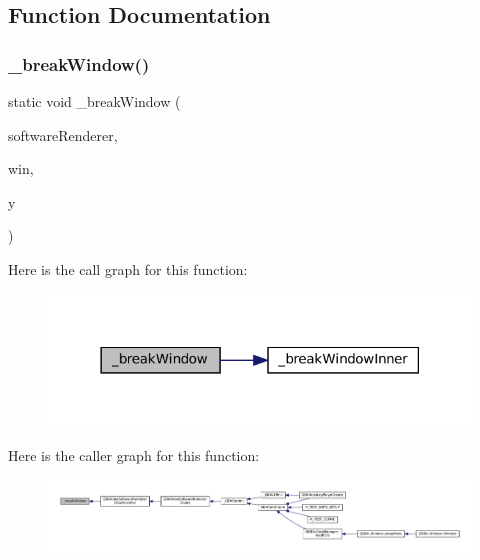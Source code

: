 \subsection{Function Documentation}
\mbox{\label{video-software_8c_ad5aac057b5c5042d19b07e0e0bca757f}} 
\subsubsection{\texorpdfstring{\+\_\+break\+Window()}{\_breakWindow()}}
{\footnotesize\ttfamily static void \+\_\+break\+Window (\begin{DoxyParamCaption}\item[{struct G\+B\+A\+Video\+Software\+Renderer $\ast$}]{software\+Renderer,  }\item[{struct WindowN $\ast$}]{win,  }\item[{\mbox{\hyperlink{ioapi_8h_a787fa3cf048117ba7123753c1e74fcd6}{int}}}]{y }\end{DoxyParamCaption})\hspace{0.3cm}{\ttfamily [static]}}

Here is the call graph for this function\+:
\nopagebreak
\begin{figure}[H]
\begin{center}
\leavevmode
\includegraphics[width=318pt]{video-software_8c_ad5aac057b5c5042d19b07e0e0bca757f_cgraph}
\end{center}
\end{figure}
Here is the caller graph for this function\+:
\nopagebreak
\begin{figure}[H]
\begin{center}
\leavevmode
\includegraphics[width=350pt]{video-software_8c_ad5aac057b5c5042d19b07e0e0bca757f_icgraph}
\end{center}
\end{figure}
\mbox{\label{video-software_8c_a1c60f25e3fc0fbe382de9e93c7bc9336}} 
